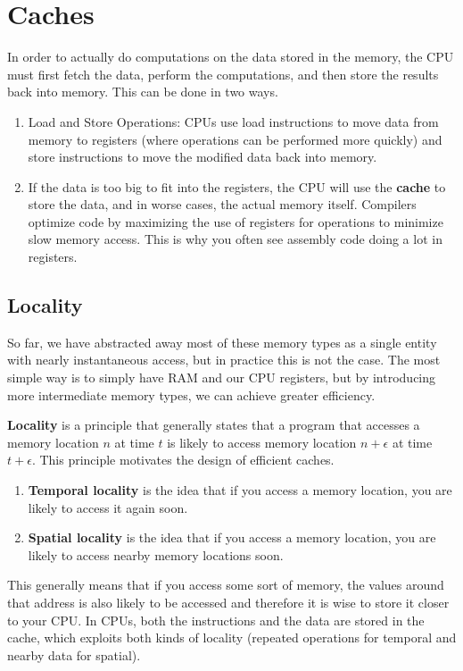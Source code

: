 \section{Caches} 

  In order to actually do computations on the data stored in the memory, the CPU must first fetch the data, perform the computations, and then store the results back into memory. This can be done in two ways.

  \begin{enumerate}
    \item Load and Store Operations: CPUs use load instructions to move data from memory to registers (where operations can be performed more quickly) and store instructions to move the modified data back into memory.
    \item If the data is too big to fit into the registers, the CPU will use the \textbf{cache} to store the data, and in worse cases, the actual memory itself. Compilers optimize code by maximizing the use of registers for operations to minimize slow memory access. This is why you often see assembly code doing a lot in registers.
  \end{enumerate}

\subsection{Locality}

  So far, we have abstracted away most of these memory types as a single entity with nearly instantaneous access, but in practice this is not the case. The most simple way is to simply have RAM and our CPU registers, but by introducing more intermediate memory types, we can achieve greater efficiency. 

  \begin{definition}[Locality]
    \label{def:locality}
    \textbf{Locality} is a principle that generally states that a program that accesses a memory location $n$ at time $t$ is likely to access memory location $n + \epsilon$ at time $t + \epsilon$. This principle motivates the design of efficient caches. 
    \begin{enumerate}
      \item \textbf{Temporal locality} is the idea that if you access a memory location, you are likely to access it again soon. 
      \item \textbf{Spatial locality} is the idea that if you access a memory location, you are likely to access nearby memory locations soon.
    \end{enumerate}
    This generally means that if you access some sort of memory, the values around that address is also likely to be accessed and therefore it is wise to store it closer to your CPU. In CPUs, both the instructions and the data are stored in the cache, which exploits both kinds of locality (repeated operations for temporal and nearby data for spatial). 
  \end{definition}

